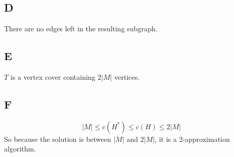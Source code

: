 \documentclass[koma,a4paper]{article}
\begin{document}
\subsection{D}
There are no edges left in the resulting subgraph.
\subsection{E}
$T$ is a vertex cover containing $2|M|$ vertices.
\subsection{F}
$$|M| \leq c(H^*) \leq c(H) \leq 2|M|$$
So because the solution is between $|M|$ and $2|M|$, it is a 2-approximation algorithm.
\end{document}
